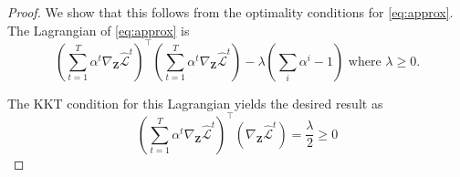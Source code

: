 \begin{proof}
We show that this follows from the optimality conditions for \ref{eq:approx}. The Lagrangian of \ref{eq:approx} is
\begin{equation}
\left(\sum_{t=1}^T \alpha^t \nabla_{\mathbf{Z}} \hat{\mathcal{L}}^t\right)^\intercal\left(\sum_{t=1}^T \alpha^t \nabla_{\mathbf{Z}} \hat{\mathcal{L}}^t\right) - \lambda \left(\sum_i \alpha^i - 1\right) \text{ where } \lambda\geq 0.
\end{equation}

The KKT condition for this Lagrangian yields the desired result as
\begin{equation}
 \left(\sum_{t=1}^T \alpha^t \nabla_{\mathbf{Z}} \hat{\mathcal{L}}^t\right)^\intercal \left( \nabla_{\mathbf{Z}} \hat{\mathcal{L}}^t \right) = \frac{\lambda}{2} \geq 0
 \end{equation}
\end{proof}
